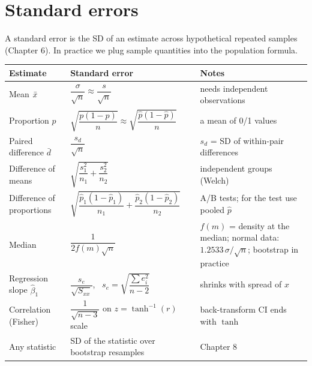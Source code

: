 \section{Standard errors}

A standard error is the SD of an estimate across hypothetical repeated samples (Chapter 6). In practice we plug sample quantities into the population formula.

\begin{center}
\small
\renewcommand{\arraystretch}{1.45}
\begin{tabular}{@{}p{3.6cm}p{5.4cm}p{5.6cm}@{}}
\toprule
Estimate & Standard error & Notes \\
\midrule
Mean $\bar{x}$ & $\dfrac{\sigma}{\sqrt n}\approx\dfrac{s}{\sqrt n}$ & needs independent observations \\
Proportion $\hat p$ & $\sqrt{\dfrac{p(1-p)}{n}}\approx\sqrt{\dfrac{\hat p(1-\hat p)}{n}}$ & a mean of 0/1 values \\
Paired difference $\bar d$ & $\dfrac{s_d}{\sqrt n}$ & $s_d$ = SD of within-pair differences \\
Difference of means & $\sqrt{\dfrac{s_1^2}{n_1}+\dfrac{s_2^2}{n_2}}$ & independent groups (Welch) \\
Difference of proportions & $\sqrt{\dfrac{\hat p_1(1-\hat p_1)}{n_1}+\dfrac{\hat p_2(1-\hat p_2)}{n_2}}$ & A/B tests; for the test use pooled $\hat p$ \\
Median & $\dfrac{1}{2f(m)\sqrt n}$ & $f(m)$ = density at the median; normal data: $1.2533\,\sigma/\sqrt n$; bootstrap in practice \\
Regression slope $\hat\beta_1$ & $\dfrac{s_e}{\sqrt{S_{xx}}}$, \ $s_e=\sqrt{\dfrac{\sum e_i^2}{n-2}}$ & shrinks with spread of $x$ \\
Correlation (Fisher) & $\dfrac{1}{\sqrt{n-3}}$ on $z=\tanh^{-1}(r)$ scale & back-transform CI ends with $\tanh$ \\
Any statistic & SD of the statistic over bootstrap resamples & Chapter 8 \\
\bottomrule
\end{tabular}
\end{center}

